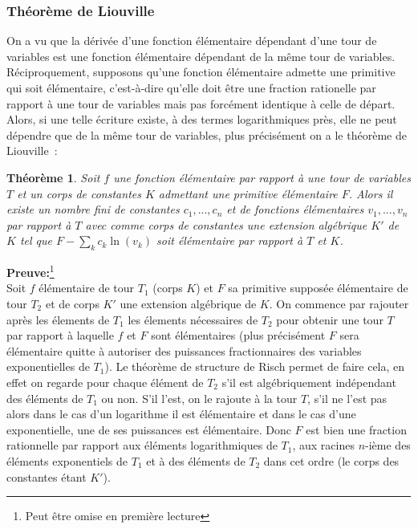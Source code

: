\documentclass[a4paper,11pt]{article}
\newtheorem{thm}{Théorème}
\begin{document}
\begin{giacjshere}
\subsubsection{Théorème de Liouville}
On a vu que la d\'eriv\'ee d'une fonction élémentaire dépendant 
d'une tour de variables est une fonction élémentaire dépendant 
de la même tour de variables.
Réciproquement, supposons qu'une fonction élémentaire admette
une primitive qui soit élémentaire, c'est-à-dire qu'elle doit
être une fraction rationelle par rapport à une tour de variables
mais pas forcément identique à celle de départ. Alors, si une telle
écriture existe, à des termes logarithmiques près, elle
ne peut dépendre que de la même tour de variables, plus précisément
on a le théorème de Liouville~:
\begin{thm}
Soit $f$ une fonction élémentaire par rapport à une tour de variables $T$
et un corps de constantes $K$ admettant une primitive élémentaire $F$. Alors 
il existe un nombre fini de constantes $c_1,...,c_n$ et de fonctions
élémentaires $v_1,...,v_n$ par rapport à $T$ avec comme corps de constantes
une extension algébrique $K'$ de $K$ tel que $F - \sum_k c_k \ln(v_k) $
soit élémentaire par rapport à $T$ et $K$.
\end{thm}

{\bf Preuve:}\footnote{Peut être omise en première lecture}\\
Soit $f$ élémentaire de tour $T_1$ (corps $K$) et 
$F$ sa primitive supposée élémentaire de tour $T_2$ et de corps $K'$
une extension algébrique de $K$. 
On commence par rajouter après les élements de $T_1$ les 
élements nécessaires de $T_2$ pour obtenir une tour $T$ par rapport
à laquelle $f$ et $F$ sont élémentaires (plus précisément $F$ sera
élémentaire quitte à autoriser des puissances fractionnaires
des variables exponentielles de $T_1$). Le théorème de structure
de Risch permet de faire cela, en effet on regarde pour chaque
élément de $T_2$ s'il est algébriquement indépendant des éléments
de $T_1$ ou non. S'il l'est, on le rajoute à la tour $T$, s'il
ne l'est pas alors dans le cas d'un logarithme il est élémentaire
et dans le cas d'une exponentielle, une de ses puissances est
élémentaire. Donc $F$ est bien une fraction rationnelle par rapport
aux éléments logarithmiques de $T_1$, aux racines $n$-ième
des éléments exponentiels de $T_1$ et à des éléments de $T_2$
dans cet ordre (le corps des constantes étant $K'$).


\end{giacjshere}
\end{document}

